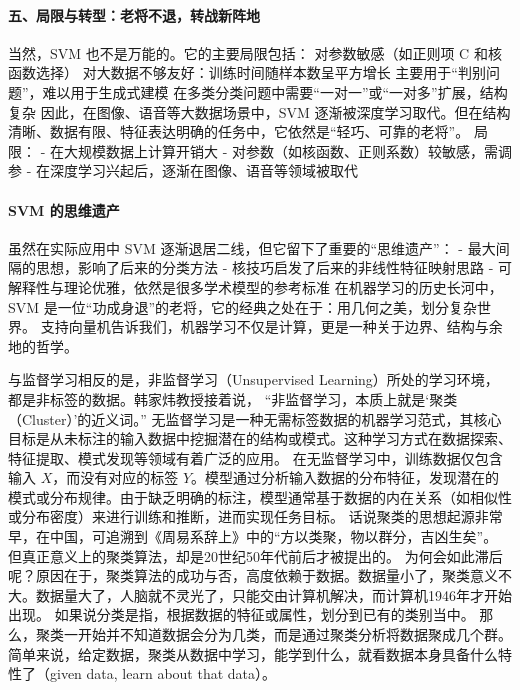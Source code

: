 \paragraph*{五、局限与转型：老将不退，转战新阵地}
当然，SVM 也不是万能的。它的主要局限包括：
对参数敏感（如正则项 C 和核函数选择）
对大数据不够友好：训练时间随样本数呈平方增长
主要用于“判别问题”，难以用于生成式建模
在多类分类问题中需要“一对一”或“一对多”扩展，结构复杂
因此，在图像、语音等大数据场景中，SVM 逐渐被深度学习取代。但在结构清晰、数据有限、特征表达明确的任务中，它依然是“轻巧、可靠的老将”。
局限：
- 在大规模数据上计算开销大
- 对参数（如核函数、正则系数）较敏感，需调参
- 在深度学习兴起后，逐渐在图像、语音等领域被取代
\paragraph*{SVM 的思维遗产}
虽然在实际应用中 SVM 逐渐退居二线，但它留下了重要的“思维遗产”：
- 最大间隔的思想，影响了后来的分类方法
- 核技巧启发了后来的非线性特征映射思路
- 可解释性与理论优雅，依然是很多学术模型的参考标准
 在机器学习的历史长河中，SVM 是一位“功成身退”的老将，它的经典之处在于：用几何之美，划分复杂世界。
支持向量机告诉我们，机器学习不仅是计算，更是一种关于边界、结构与余地的哲学。

与监督学习相反的是，非监督学习（Unsupervised Learning）所处的学习环境，都是非标签的数据。韩家炜教授接着说\cite{han2011data}，
“非监督学习，本质上就是‘聚类（Cluster）’的近义词。”
无监督学习是一种无需标签数据的机器学习范式，其核心目标是从未标注的输入数据中挖掘潜在的结构或模式。这种学习方式在数据探索、特征提取、模式发现等领域有着广泛的应用。
在无监督学习中，训练数据仅包含输入 $X$，而没有对应的标签 $Y$。模型通过分析输入数据的分布特征，发现潜在的模式或分布规律。由于缺乏明确的标注，模型通常基于数据的内在关系（如相似性或分布密度）来进行训练和推断，进而实现任务目标。
话说聚类的思想起源非常早，在中国，可追溯到《周易\textperiodcentered 系辞上》中的“方以类聚，物以群分，吉凶生矣”。
但真正意义上的聚类算法，却是20世纪50年代前后才被提出的。
为何会如此滞后呢？原因在于，聚类算法的成功与否，高度依赖于数据。数据量小了，聚类意义不大。数据量大了，人脑就不灵光了，只能交由计算机解决，而计算机1946年才开始出现。
如果说分类是指，根据数据的特征或属性，划分到已有的类别当中。
那么，聚类一开始并不知道数据会分为几类，而是通过聚类分析将数据聚成几个群。
简单来说，给定数据，聚类从数据中学习，能学到什么，就看数据本身具备什么特性了（given data, learn about that data）。

